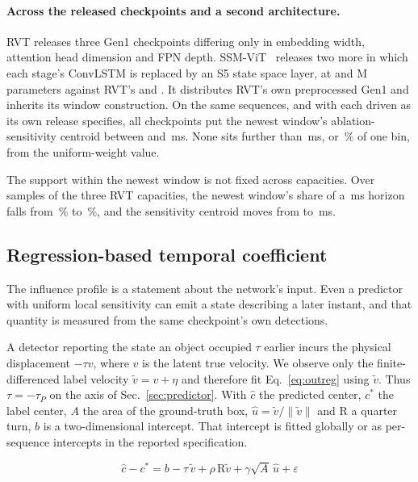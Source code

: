 \documentclass[10pt,twocolumn,letterpaper]{article}
\begin{document}
\paragraph{Across the released checkpoints and a second architecture.}
RVT releases three Gen1 checkpoints differing only in embedding width, attention
head dimension and FPN depth. SSM-ViT~\cite{zubic2024ssm} releases two more in
which each stage's ConvLSTM is replaced by an S5 state space layer, at \ssmParamsS{}
and \ssmParamsB{} M parameters against RVT's \capParamsS{} and \capParamsB{}.
It distributes RVT's own preprocessed Gen1 and inherits its window construction. On the same sequences, and
with each driven as its own release specifies, all \archCkpts{} checkpoints put the
newest window's ablation-sensitivity centroid between \archHi{} and \archLo\,ms. None sits further than
\archUnifMax\,ms, or \archUnifPct\,\% of one bin, from the uniform-weight value.

The support within the newest window
is not fixed across capacities. Over \capSamples{} samples of the
three RVT capacities, the newest window's share of a \capHorizon\,ms horizon
falls from \capShareT\,\% to \capShareB\,\%, and the sensitivity centroid moves
from \capSuppT{} to \capSuppB\,ms.

\subsection{Regression-based temporal coefficient}
\label{sec:outputtime}

The influence profile is a statement about the network's input. Even a predictor
with uniform local sensitivity can emit a state describing a later instant,
and that quantity is measured from the same checkpoint's own detections.

A detector reporting the state an object occupied $\tau$ earlier incurs the
physical displacement $-\tau v$, where $v$ is the latent true velocity. We
observe only the finite-differenced label velocity $\tilde v=v+\eta$ and
therefore fit Eq.~\ref{eq:outreg} using $\tilde v$. Thus
$\tau=-\tau_{P}$ on the axis of Sec.~\ref{sec:predictor}. With $\hat{c}$ the
predicted center, $c^{*}$ the label center, $A$ the area of the ground-truth
box, $\hat{u}=\tilde v/\lVert \tilde v\rVert$ and $\mathrm{R}$ a quarter turn,
$b$ is a two-dimensional intercept. That intercept is fitted globally or as
per-sequence intercepts in the reported specification.

\begin{equation}
\hat{c}-c^{*}=b-\tau\,\tilde v+\rho\,\mathrm{R}\tilde v+\gamma\sqrt{A}\,\hat{u}+\varepsilon
\label{eq:outreg}
\end{equation}
\end{document}
